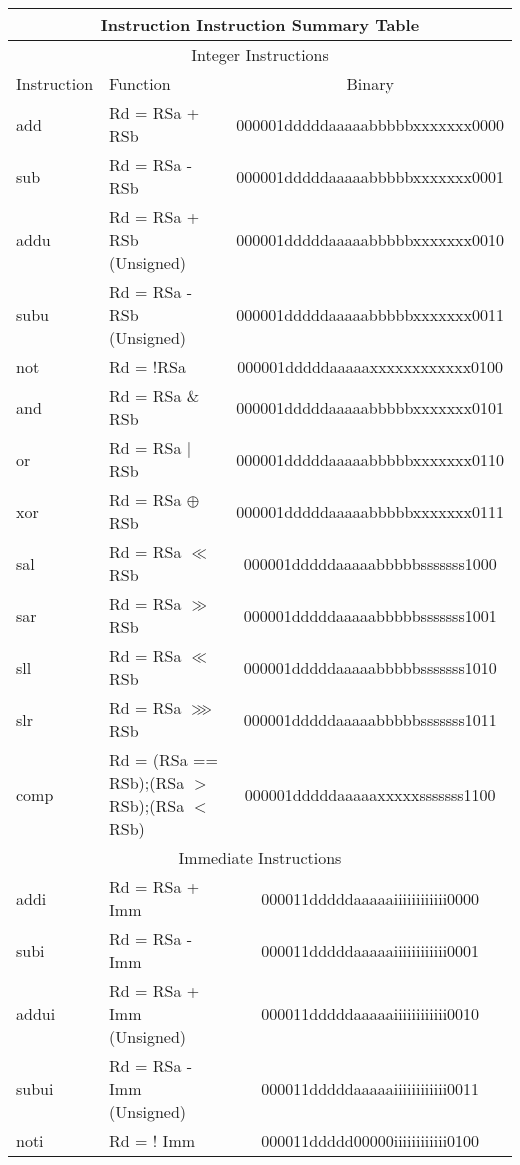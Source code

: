 \documentclass[letterpaper, 11pt]{article}
\begin{document}
	\begin{center}
		\begin{longtable}{|l|l|c|}
			\multicolumn{3}{c}{Instruction Instruction Summary Table} \\ \hline
			\multicolumn{3}{|c|}{Integer Instructions} \\ \hline
			Instruction & Function 										& Binary \\ \hline
			add			& Rd = RSa + RSb 								& 000001dddddaaaaabbbbbxxxxxxx0000 \\
			sub			& Rd = RSa - RSb 								& 000001dddddaaaaabbbbbxxxxxxx0001 \\
			addu		& Rd = RSa + RSb (Unsigned) 					& 000001dddddaaaaabbbbbxxxxxxx0010 \\
			subu		& Rd = RSa - RSb (Unsigned)					 	& 000001dddddaaaaabbbbbxxxxxxx0011 \\
			not		& Rd = !RSa	 									& 000001dddddaaaaaxxxxxxxxxxxx0100 \\
			and			& Rd = RSa \& RSb								& 000001dddddaaaaabbbbbxxxxxxx0101 \\
			or			& Rd = RSa $|$ RSb 								& 000001dddddaaaaabbbbbxxxxxxx0110 \\
			xor			& Rd = RSa $\oplus$ RSb 						& 000001dddddaaaaabbbbbxxxxxxx0111 \\
			sal			& Rd = RSa $\ll$ RSb 							& 000001dddddaaaaabbbbbsssssss1000 \\
			sar			& Rd = RSa $\gg$ RSb 							& 000001dddddaaaaabbbbbsssssss1001 \\
			sll			& Rd = RSa $\ll$ RSb 							& 000001dddddaaaaabbbbbsssssss1010 \\
			slr			& Rd = RSa $ \ggg  $ RSb 						& 000001dddddaaaaabbbbbsssssss1011 \\
			comp		& Rd = (RSa == RSb);(RSa $>$ RSb);(RSa $<$ RSb)	& 000001dddddaaaaaxxxxxsssssss1100 \\
			\hline
			\multicolumn{3}{|c|}{Immediate Instructions} \\ \hline
			addi		& Rd = RSa + Imm 								& 000011dddddaaaaaiiiiiiiiiiii0000 \\
			subi		& Rd = RSa - Imm 								& 000011dddddaaaaaiiiiiiiiiiii0001 \\
			addui		& Rd = RSa + Imm (Unsigned)						& 000011dddddaaaaaiiiiiiiiiiii0010 \\
			subui		& Rd = RSa - Imm (Unsigned)					 	& 000011dddddaaaaaiiiiiiiiiiii0011 \\
			noti		& Rd = ! Imm									& 000011ddddd00000iiiiiiiiiiii0100 \\

\end{longtable}
\end{center}
\end{document}
